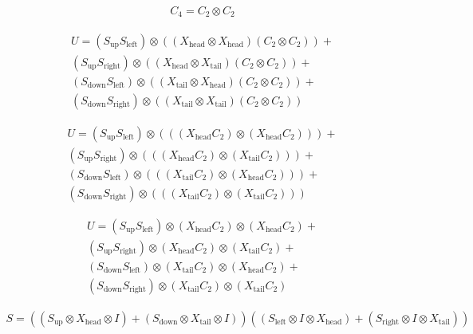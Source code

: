 \begin{align}
  C_4 = C_2 \otimes C_2
\end{align}

\begin{align}
  U =
  (S_{\text{up}}  S_{\text{left}}) \otimes ((X_{\text{head}} \otimes X_{\text{head}}) (C_2 \otimes C_2)) +   \\
  (S_{\text{up}}  S_{\text{right}}) \otimes ((X_{\text{head}} \otimes X_{\text{tail}}) (C_2 \otimes C_2)) +  \\
  (S_{\text{down}}  S_{\text{left}}) \otimes ((X_{\text{tail}} \otimes X_{\text{head}}) (C_2 \otimes C_2)) + \\
  (S_{\text{down}}  S_{\text{right}}) \otimes ((X_{\text{tail}} \otimes X_{\text{tail}}) (C_2 \otimes C_2))
\end{align}


\begin{align}
  U =
  (S_{\text{up}}  S_{\text{left}}) \otimes (((X_{\text{head}}C_2) \otimes (X_{\text{head}}C_2))) +   \\
  (S_{\text{up}}  S_{\text{right}}) \otimes (((X_{\text{head}}C_2) \otimes (X_{\text{tail}}C_2))) +  \\
  (S_{\text{down}}  S_{\text{left}}) \otimes (((X_{\text{tail}}C_2) \otimes (X_{\text{head}}C_2))) + \\
  (S_{\text{down}}  S_{\text{right}}) \otimes (((X_{\text{tail}}C_2) \otimes (X_{\text{tail}}C_2)))
\end{align}


\begin{align}
  U =
  (S_{\text{up}}  S_{\text{left}}) \otimes (X_{\text{head}}C_2) \otimes (X_{\text{head}}C_2) +   \\
  (S_{\text{up}}  S_{\text{right}}) \otimes (X_{\text{head}}C_2) \otimes (X_{\text{tail}}C_2) +  \\
  (S_{\text{down}}  S_{\text{left}}) \otimes (X_{\text{tail}}C_2) \otimes (X_{\text{head}}C_2) + \\
  (S_{\text{down}}  S_{\text{right}}) \otimes (X_{\text{tail}}C_2) \otimes (X_{\text{tail}}C_2)
\end{align}


\begin{align}
  S = ((S_{\text{up}} \otimes  X_{\text{head}} \otimes I) +
  (S_{\text{down}} \otimes X_{\text{tail}} \otimes I))
  ((S_{\text{left}} \otimes I \otimes X_{\text{head}}) +
  (S_{\text{right}} \otimes I \otimes  X_{\text{tail}} ))
\end{align}

